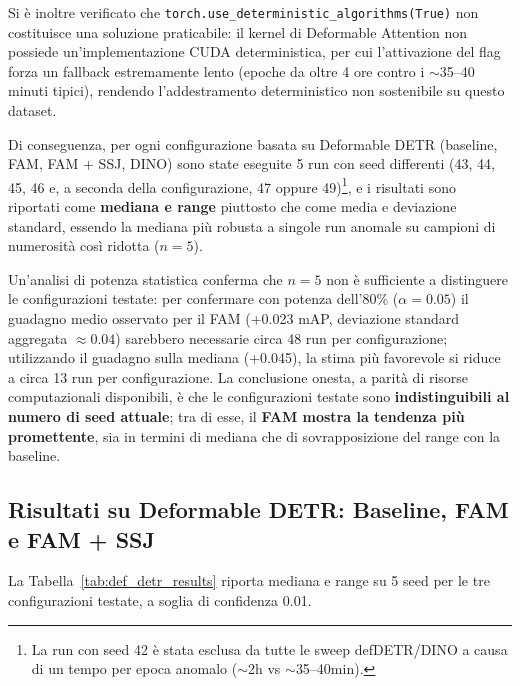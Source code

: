 \documentclass[a4paper,11pt]{article}
\begin{document}
Si è inoltre verificato che \texttt{torch.use\_deterministic\_algorithms(True)} non costituisce una soluzione praticabile: il kernel di Deformable Attention non possiede un'implementazione CUDA deterministica, per cui l'attivazione del flag forza un fallback estremamente lento (epoche da oltre 4 ore contro i $\sim$35--40 minuti tipici), rendendo l'addestramento deterministico non sostenibile su questo dataset.

Di conseguenza, per ogni configurazione basata su Deformable DETR (baseline, FAM, FAM + SSJ, DINO) sono state eseguite 5 run con seed differenti (43, 44, 45, 46 e, a seconda della configurazione, 47 oppure 49)\footnote{La run con seed 42 è stata esclusa da tutte le sweep defDETR/DINO a causa di un tempo per epoca anomalo ($\sim$2h vs $\sim$35--40min).}, e i risultati sono riportati come \textbf{mediana e range} piuttosto che come media e deviazione standard, essendo la mediana più robusta a singole run anomale su campioni di numerosità così ridotta ($n=5$).

Un'analisi di potenza statistica conferma che $n=5$ non è sufficiente a distinguere le configurazioni testate: per confermare con potenza dell'80\% ($\alpha=0.05$) il guadagno medio osservato per il FAM (+0.023 mAP, deviazione standard aggregata $\approx 0.04$) sarebbero necessarie circa 48 run per configurazione; utilizzando il guadagno sulla mediana (+0.045), la stima più favorevole si riduce a circa 13 run per configurazione. La conclusione onesta, a parità di risorse computazionali disponibili, è che le configurazioni testate sono \textbf{indistinguibili al numero di seed attuale}; tra di esse, il \textbf{FAM mostra la tendenza più promettente}, sia in termini di mediana che di sovrapposizione del range con la baseline.

\subsection{Risultati su Deformable DETR: Baseline, FAM e FAM + SSJ}

La Tabella~\ref{tab:def_detr_results} riporta mediana e range su 5 seed per le tre configurazioni testate, a soglia di confidenza 0.01.
\end{document}
